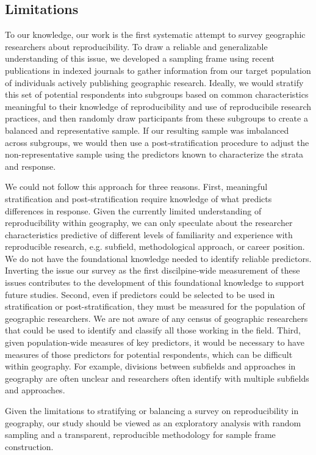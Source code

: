\documentclass[]{interact}
\theoremstyle{plain}%
\theoremstyle{definition}
\theoremstyle{remark}
\begin{document}
\subsection*{Limitations}
To our knowledge, our work is the first systematic attempt to survey geographic researchers about reproducibility. 
To draw a reliable and generalizable understanding of this issue, we developed a sampling frame using recent publications in indexed journals to gather information from our target population of individuals actively publishing geographic research. 
Ideally, we would stratify this set of potential respondents into subgroups based on common characteristics meaningful to their knowledge of reproducibility and use of reproducibile research practices, and then randomly draw participants from these subgroups to create a balanced and representative sample. 
If our resulting sample was imbalanced across subgroups, we would then use a post-stratification procedure to adjust the non-representative sample using the predictors known to characterize the strata and response.   

We could not follow this approach for three reasons. 
First, meaningful stratification and post-stratification require knowledge of what predicts differences in response.
Given the currently limited understanding of reproducibility within geography, we can only speculate about the researcher characteristics predictive of different levels of familiarity and experience with reproducible research, e.g. subfield, methodological approach, or career position.
We do not have the foundational knowledge needed to identify reliable predictors.
Inverting the issue our survey as the first discilpine-wide measurement of these issues contributes to the development of this foundational knowledge to support future studies.
Second, even if predictors could be selected to be used in stratification or post-stratification, they must be measured for the population of geographic researchers.
We are not aware of any census of geographic researchers that could be used to identify and classify all those working in the field.
Third, given population-wide measures of key predictors, it would be necessary to have measures of those predictors for potential respondents, which can be difficult within geography.
For example, divisions between subfields and approaches in geography are often unclear and researchers often identify with multiple subfields and approaches. 

Given the limitations to stratifying or balancing a survey on reproducibility in geography, our study should be viewed as an exploratory analysis with random sampling and a transparent, reproducible methodology for sample frame construction.
\end{document}

